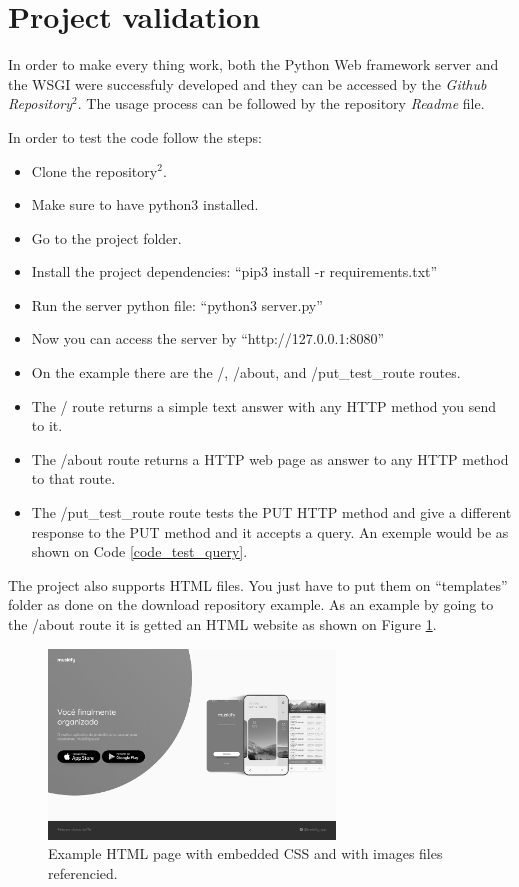 \documentclass[journal,12pt,onecolumn,draftclsnofoot,]{IEEEtran}
\let\i\textit
\begin{document}
\section{Project validation}
In order to make every thing work, both the Python Web framework server and the WSGI were successfuly developed and they can be accessed by the \i{Github Repository}$^2$. The usage process can be followed by the repository \i{Readme} file.

In order to test the code follow the steps:
\begin{itemize}
    \item Clone the repository$^2$.
    \item Make sure to have python3 installed.
    \item Go to the project folder.
    \item Install the project dependencies: ``pip3 install -r requirements.txt''
    \item Run the server python file: ``python3 server.py''
    \item Now you can access the server by ``http://127.0.0.1:8080''
    \item On the example there are the /, /about, and /put\_test\_route routes.
    \item The / route returns a simple text answer with any HTTP method you send to it.
    \item The /about route returns a HTTP web page as answer to any HTTP method to that route.
    \item The /put\_test\_route route tests the PUT HTTP method and give a different response to the PUT method and it accepts a query. An exemple would be as shown on Code \ref{code_test_query}.
\end{itemize}

The project also supports HTML files. You just have to put them on ``templates'' folder as done on the download repository example. As an example by going to the /about route it is getted an HTML website as shown on Figure \ref{fig_site}.

\begin{figure}
  \begin{center}
  \includegraphics[width=3.0in]{./imgs/example_page.png}
  \caption{Example HTML page with embedded CSS and with images files referencied.}
  \label{fig_site}
  \end{center}
\end{figure}
\end{document}
